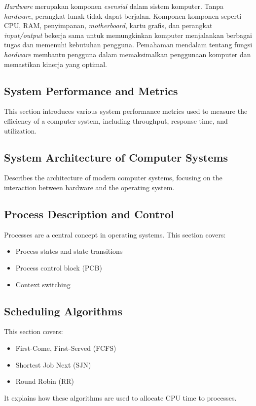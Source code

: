 \documentclass[12pt]{article}
\begin{document}
\hspace{0.61cm}\textit{Hardware} merupakan komponen \textit{esensial} dalam sistem komputer. Tanpa \textit{hardware}, perangkat lunak tidak dapat berjalan. Komponen-komponen seperti CPU, RAM, penyimpanan, \textit{motherboard}, kartu grafis, dan perangkat \textit{input/output} bekerja sama untuk memungkinkan komputer menjalankan berbagai tugas dan memenuhi kebutuhan pengguna. Pemahaman mendalam tentang fungsi \textit{hardware} membantu pengguna dalam memaksimalkan penggunaan komputer dan memastikan kinerja yang optimal.

\subsection{System Performance and Metrics}
This section introduces various system performance metrics used to measure the efficiency of a computer system, including throughput, response time, and utilization.

\subsection{System Architecture of Computer Systems}
Describes the architecture of modern computer systems, focusing on the interaction between hardware and the operating system.

\subsection{Process Description and Control}
Processes are a central concept in operating systems. This section covers:
\begin{itemize}
    \item Process states and state transitions
    \item Process control block (PCB)
    \item Context switching
\end{itemize}

\subsection{Scheduling Algorithms}
This section covers:
\begin{itemize}
    \item First-Come, First-Served (FCFS)
    \item Shortest Job Next (SJN)
    \item Round Robin (RR)
\end{itemize}
It explains how these algorithms are used to allocate CPU time to processes.
\end{document}

